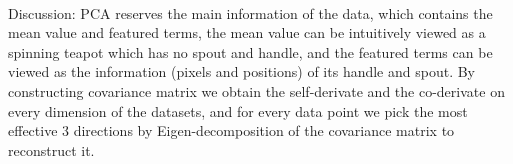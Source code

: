 \documentclass[a4paper,12pt]{article}
\begin{document}
\begin{figure}[h]
\centering
{}
\end{figure}
\\
\begin{figure}[h]
\centering
{}
\end{figure}

Discussion: PCA reserves the main information of the data, which contains the mean value and featured terms, the mean value can be intuitively viewed as a spinning teapot which has no spout and handle, and the featured terms can be viewed as the information (pixels and positions) of its handle and spout. By constructing covariance matrix we obtain the self-derivate and the co-derivate on every dimension of the datasets, and for every data point we pick the most effective 3 directions by Eigen-decomposition of the covariance matrix to reconstruct it.
\end{document}
